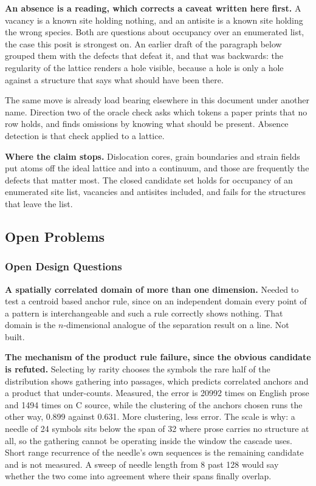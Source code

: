 \textbf{An absence is a reading, which corrects a caveat written here first.} A vacancy is a known site holding nothing, and an antisite is a known site holding the wrong species. Both are questions about occupancy over an enumerated list, the case this posit is strongest on. An earlier draft of the paragraph below grouped them with the defects that defeat it, and that was backwards: the regularity of the lattice renders a hole visible, because a hole is only a hole against a structure that says what should have been there.

The same move is already load bearing elsewhere in this document under another name. Direction two of the oracle check asks which tokens a paper prints that no row holds, and finds omissions by knowing what should be present. Absence detection is that check applied to a lattice.

\textbf{Where the claim stops.} Dislocation cores, grain boundaries and strain fields put atoms off the ideal lattice and into a continuum, and those are frequently the defects that matter most. The closed candidate set holds for occupancy of an enumerated site list, vacancies and antisites included, and fails for the structures that leave the list.

\subsection{Open Problems}

\subsubsection{Open Design Questions}

\textbf{A spatially correlated domain of more than one dimension.} Needed to test a centroid based anchor rule, since on an independent domain every point of a pattern is interchangeable and such a rule correctly shows nothing. That domain is the \(n\)-dimensional analogue of the separation result on a line. Not built.

\textbf{The mechanism of the product rule failure, since the obvious candidate is refuted.} Selecting by rarity chooses the symbols the rare half of the distribution shows gathering into passages, which predicts correlated anchors and a product that under-counts. Measured, the error is 20992 times on English prose and 1494 times on C source, while the clustering of the anchors chosen runs the other way, 0.899 against 0.631. More clustering, less error. The scale is why: a needle of 24 symbols sits below the span of 32 where prose carries no structure at all, so the gathering cannot be operating inside the window the cascade uses. Short range recurrence of the needle's own sequences is the remaining candidate and is not measured. A sweep of needle length from 8 past 128 would say whether the two come into agreement where their spans finally overlap.

